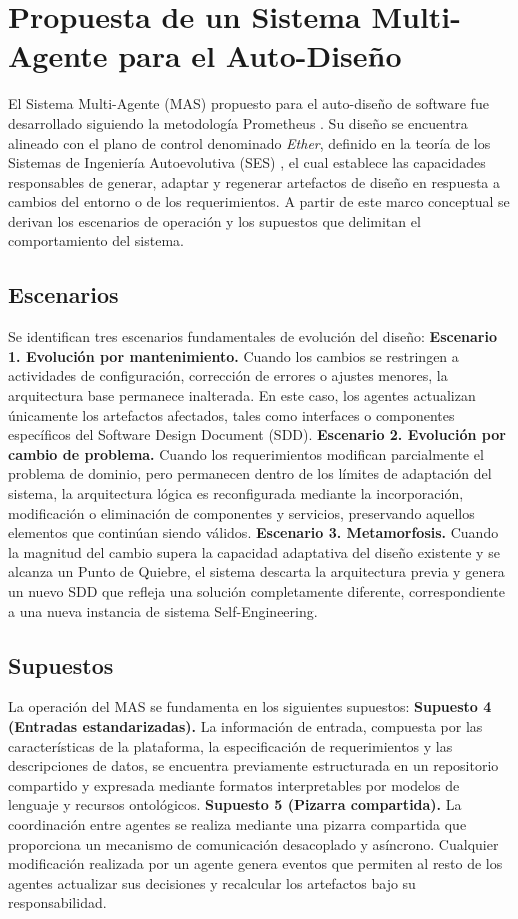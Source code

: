 \documentclass[12pt, letterpaper, oneside]{book}
\begin{document}
\section{Propuesta de un Sistema Multi-Agente para el Auto-Diseño} El Sistema Multi-Agente (MAS) propuesto para el auto-diseño de software fue desarrollado siguiendo la metodología Prometheus \cite{prometheus_padgham2005}. Su diseño se encuentra alineado con el plano de control denominado \textit{Ether}, definido en la teoría de los Sistemas de Ingeniería Autoevolutiva (SES) \cite{PerezCarrillo2026}, el cual establece las capacidades responsables de generar, adaptar y regenerar artefactos de diseño en respuesta a cambios del entorno o de los requerimientos. A partir de este marco conceptual se derivan los escenarios de operación y los supuestos que delimitan el comportamiento del sistema. \subsection{Escenarios} Se identifican tres escenarios fundamentales de evolución del diseño: \textbf{Escenario 1. Evolución por mantenimiento.} Cuando los cambios se restringen a actividades de configuración, corrección de errores o ajustes menores, la arquitectura base permanece inalterada. En este caso, los agentes actualizan únicamente los artefactos afectados, tales como interfaces o componentes específicos del Software Design Document (SDD). \textbf{Escenario 2. Evolución por cambio de problema.} Cuando los requerimientos modifican parcialmente el problema de dominio, pero permanecen dentro de los límites de adaptación del sistema, la arquitectura lógica es reconfigurada mediante la incorporación, modificación o eliminación de componentes y servicios, preservando aquellos elementos que continúan siendo válidos. \textbf{Escenario 3. Metamorfosis.} Cuando la magnitud del cambio supera la capacidad adaptativa del diseño existente y se alcanza un Punto de Quiebre, el sistema descarta la arquitectura previa y genera un nuevo SDD que refleja una solución completamente diferente, correspondiente a una nueva instancia de sistema Self-Engineering. \subsection{Supuestos} La operación del MAS se fundamenta en los siguientes supuestos: \textbf{Supuesto 4 (Entradas estandarizadas).} La información de entrada, compuesta por las características de la plataforma, la especificación de requerimientos y las descripciones de datos, se encuentra previamente estructurada en un repositorio compartido y expresada mediante formatos interpretables por modelos de lenguaje y recursos ontológicos. \textbf{Supuesto 5 (Pizarra compartida).} La coordinación entre agentes se realiza mediante una pizarra compartida que proporciona un mecanismo de comunicación desacoplado y asíncrono. Cualquier modificación realizada por un agente genera eventos que permiten al resto de los agentes actualizar sus decisiones y recalcular los artefactos bajo su responsabilidad.
\end{document}

